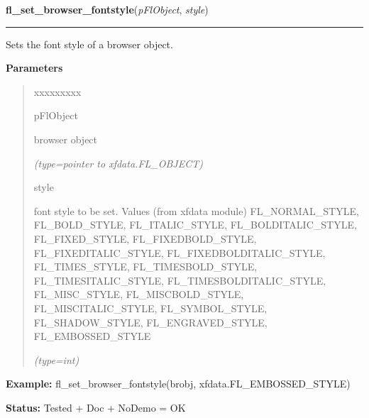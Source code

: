 \hspace{.8\funcindent}\begin{boxedminipage}{\funcwidth}

    \raggedright \textbf{fl\_set\_browser\_fontstyle}(\textit{pFlObject}, \textit{style})

    \vspace{-1.5ex}

    \rule{\textwidth}{0.5\fboxrule}
\setlength{\parskip}{2ex}
    Sets the font style of a browser object.

\setlength{\parskip}{1ex}
      \textbf{Parameters}
      \vspace{-1ex}

      \begin{quote}
        \begin{Ventry}{xxxxxxxxx}

          \item[pFlObject]

          browser object

            {\it (type=pointer to xfdata.FL\_OBJECT)}

          \item[style]

          font style to be set. Values (from xfdata module) 
          FL\_NORMAL\_STYLE, FL\_BOLD\_STYLE, FL\_ITALIC\_STYLE, 
          FL\_BOLDITALIC\_STYLE, FL\_FIXED\_STYLE, FL\_FIXEDBOLD\_STYLE, 
          FL\_FIXEDITALIC\_STYLE, FL\_FIXEDBOLDITALIC\_STYLE, 
          FL\_TIMES\_STYLE, FL\_TIMESBOLD\_STYLE, FL\_TIMESITALIC\_STYLE, 
          FL\_TIMESBOLDITALIC\_STYLE, FL\_MISC\_STYLE, FL\_MISCBOLD\_STYLE,
          FL\_MISCITALIC\_STYLE, FL\_SYMBOL\_STYLE, FL\_SHADOW\_STYLE, 
          FL\_ENGRAVED\_STYLE, FL\_EMBOSSED\_STYLE

            {\it (type=int)}

        \end{Ventry}

      \end{quote}

\textbf{Example:} fl\_set\_browser\_fontstyle(brobj, xfdata.FL\_EMBOSSED\_STYLE)



\textbf{Status:} Tested + Doc + NoDemo = OK



    \end{boxedminipage}

    \label{xformslib:flbrowser:fl_set_browser_specialkey}

